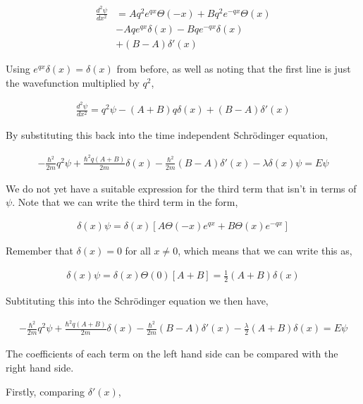 \documentclass[11pt]{amsart}
\begin{document}
\begin{align*}
  \frac{d^2\psi}{dx^2} &= Aq^2e^{qx}\Theta(-x) + Bq^2e^{-qx}\Theta(x) \\
                       &- Aqe^{qx}\delta(x) - Bqe^{-qx}\delta(x) \\
                       &+ (B-A)\delta'(x)
\end{align*}

Using $e^{qx}\delta(x) = \delta(x)$ from before, as well as noting that the first line is just the wavefunction multiplied by $q^2$,

\begin{align*}
  \frac{d^2\psi}{dx^2} = q^2\psi - (A+B)q\delta(x) + (B-A)\delta'(x)
\end{align*}

By substituting this back into the time independent Schr\"{o}dinger equation,

\begin{align*}
  -\frac{\hbar^2}{2m}q^2\psi+\frac{\hbar^2q\left(A+B\right)}{2m}\delta(x) - \frac{\hbar^2}{2m}\left(B - A\right)\delta'(x) - \lambda\delta(x)\psi = E\psi
\end{align*}

We do not yet have a suitable expression for the third term that isn't in terms of $\psi$. Note that we can write the third term in the form,

\begin{align*}
  \delta(x)\psi=\delta(x)\left[A\Theta(-x)e^{qx}+B\Theta(x)e^{-qx}\right]
\end{align*}

Remember that $\delta(x) = 0$ for all $x \neq 0$, which means that we can write this as,

\begin{align*}
  \delta(x)\psi=\delta(x)\Theta(0)\left[A+B\right] = \frac{1}{2}(A+B)\delta(x)
\end{align*}

Subtituting this into the Schr\"{o}dinger equation we then have,

\begin{align*}
  -\frac{\hbar^2}{2m}q^2\psi+\frac{\hbar^2q\left(A+B\right)}{2m}\delta(x) - \frac{\hbar^2}{2m}\left(B - A\right)\delta'(x) - \frac{\lambda}{2}\left(A+B\right)\delta(x) = E\psi
\end{align*}

The coefficients of each term on the left hand side can be compared with the right hand side.

Firstly, comparing $\delta'(x)$,
\end{document}
